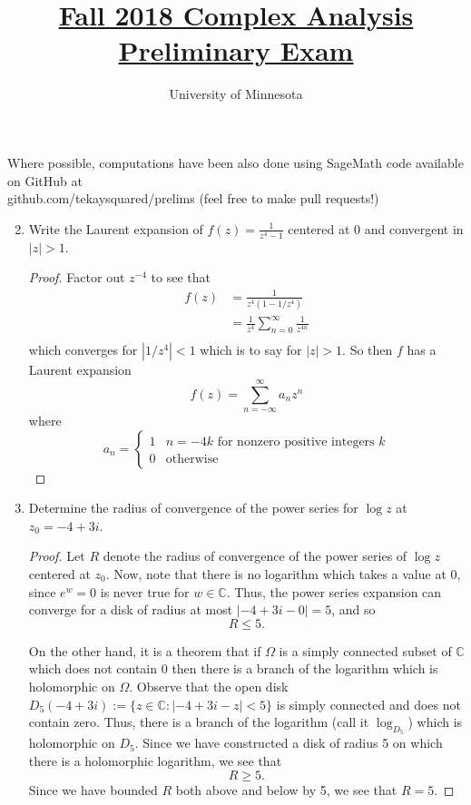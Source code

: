 \documentclass{article}
\title{\href{https://math.umn.edu/sites/math.umn.edu/files/exams/complexf18.pdf}{Fall 2018 Complex Analysis Preliminary Exam}}
\author{University of Minnesota}
\date{}
\begin{document}
\maketitle

Where possible, computations have been also done using SageMath code available on GitHub at \\ github.com/tekaysquared/prelims (feel free to make pull requests!)

\begin{enumerate}


	\setcounter{enumi}{1}
	
	\item Write the Laurent expansion of $f(z) = \frac{1}{z^4-1}$ centered at $0$ and convergent in $|z|>1$.
	
	\begin{proof}
		Factor out $z^{-4}$ to see that 
		\begin{align*}
			f(z) &= \frac{1}{z^4 (1 - {1}/{z^4})}\\
			&= \frac{1}{z^4} \sum_{n=0}^\infty \frac{1}{z^{4n}} \\
		\end{align*}
		which converges for $|1/z^4| <1$ which is to say for $|z|>1$.
		So then $f$ has a Laurent expansion
		\[f(z) = \sum_{n = - \infty}^{\infty} a_n z^{n} \]
		where 
		\[ a_n = \begin{cases}
						  1 & n = -4k \text{ for nonzero positive integers }k\\
						  0 & \text{otherwise}
		\end{cases}\]
	\end{proof} 
	
	\setcounter{enumi}{5}
	\item Determine the radius of convergence of the power series for $\log z$ at $z_0 = -4 + 3i$.
	
	\begin{proof}
		Let $R$ denote the radius of convergence of the power series of $\log z$ centered at $z_0$.
		Now, note that there is no logarithm which takes a value at $0$, since $e^w = 0$ is never true for $w \in \mathbb{C}$.
		Thus, the power series expansion can converge for a disk of radius at most $|-4+3i - 0| = 5$, and so 
		\[ R \leq 5.\]
		
		On the other hand, it is a theorem that if $\Omega$ is a simply connected subset of 
		$\mathbb{C}$ which does not contain $0$ then there is a branch of the logarithm which is holomorphic on $\Omega$. Observe that the open disk $D_{5}(-4+3i) := \{ z \in \mathbb{C} : |-4+3i - z | < 5\}$ is simply connected and does not contain zero. Thus, there is a branch of the logarithm (call it $\log_{D_5}$) which is holomorphic on $D_5$. Since we have constructed a disk of radius 5 on which there is a holomorphic logarithm, we see that 
		\[ R \geq 5.\]
		Since we have bounded $R$ both above and below by 5, we see that $R=5$.		
	\end{proof}
	
\end{enumerate}
\end{document}
